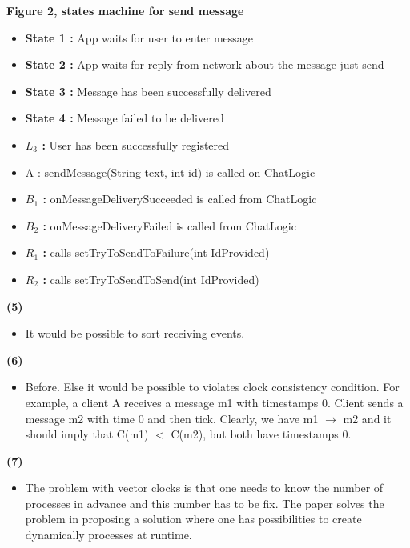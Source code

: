 \documentclass[11pt]{article}
\renewcommand\part[1]{\vspace{.10in}\textbf{(#1)}}
\begin{document}
\textbf{Figure 2, states machine for send message}

\begin{itemize}
	\item \textbf{State 1 : } App waits for user to enter message
	\item \textbf{State 2 : } App waits for reply from network about the message just send
	\item \textbf{State 3 : } Message has been successfully delivered
	\item \textbf{State 4 : } Message failed to be delivered
	\item \textbf{$L_{3}$ : } User has been successfully registered
	\item A : sendMessage(String text, int id) is called on ChatLogic
	\item \textbf{$B_{1}$ : } onMessageDeliverySucceeded is called from ChatLogic
	\item \textbf{$B_{2}$ : } onMessageDeliveryFailed is called from ChatLogic
	\item \textbf{$R_{1}$ : } calls setTryToSendToFailure(int IdProvided)
	\item \textbf{$R_{2}$ : } calls setTryToSendToSend(int IdProvided)
\end{itemize}

\clearpage

\part{5}

\begin{itemize}
	\item It would be possible to sort receiving events.
\end{itemize}

\part{6}

\begin{itemize}
	\item Before. Else it would be possible to violates clock consistency condition. For example, a client A receives a message m1 with timestamps 0. Client sends a message m2 with time 0 and then tick. Clearly, we have m1 $\rightarrow$ m2 and it should imply that C(m1) $<$ C(m2), but both have timestamps 0.

\end{itemize}

\part{7}

\begin{itemize}
	\item The problem with vector clocks is that one needs to know the number of processes in advance and this number has to be fix. The paper solves the problem in proposing a solution where one has possibilities to create dynamically processes at runtime.
\end{itemize}
\end{document}
